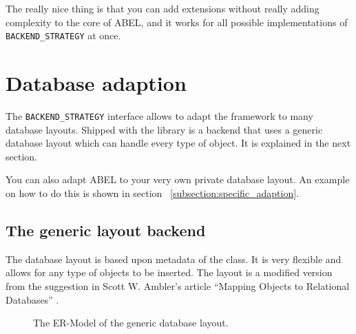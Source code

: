 The really nice thing is that you can add extensions without really adding complexity to the core of ABEL, and it works for all possible implementations of \lstinline!BACKEND_STRATEGY! at once.


\section{Database adaption}

The \lstinline!BACKEND_STRATEGY! interface allows to adapt the framework to many database layouts.
Shipped with the library is a backend that uses a generic database layout which can handle every type of object.
It is explained in the next section.

You can also adapt ABEL to your very own private database layout.
An example on how to do this is shown in section ~\ref{subsection:specific_adaption}.

\subsection{The generic layout backend}

The database layout is based upon metadata of the class. 
It is very flexible and allows for any type of objects to be inserted.
The layout is a modified version from the suggestion in Scott W. Ambler's article ``Mapping Objects to Relational Databases'' \cite{AmblerORM}.

\begin{figure} [h!]
\centering
{}
\caption{The ER-Model of the generic database layout.}
\label{fig:er_model_generic_layout}
\end{figure}


